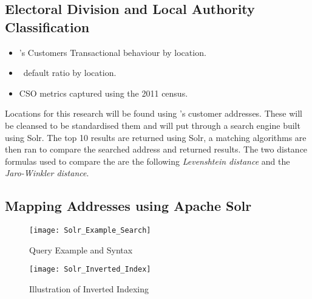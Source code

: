 \subsection{Electoral Division and Local Authority Classification}
\begin{itemize}
	\item \subjectname's Customers Transactional behaviour by location.
	\item \subjectname\ default ratio by location.
	\item CSO metrics captured using the 2011 census. 
\end{itemize}

Locations for this research will be found using \subjectname's customer addresses. These will be cleansed to be standardised them and will put through a search engine built using Solr. The top 10 results are returned using Solr, a matching algorithms are then ran to compare the searched address and returned results. The two distance formulas used to compare the are the following \textit{Levenshtein distance} and the \textit{Jaro-Winkler distance}.

\subsection{Mapping Addresses using Apache Solr}


\begin{figure}[h!]
	\texttt{[image: Solr\_Example\_Search]}
	\caption[Query Example and Syntax]
	{Query Example and Syntax}
	\label{fig:Solr_Example_Search}
\end{figure}

\begin{figure}[h!]
	\texttt{[image: Solr\_Inverted\_Index]}
	\caption[Illustration of Inverted Indexing]
	{Illustration of Inverted Indexing}
	\label{fig:Solr_Inverted_Index}
\end{figure}

